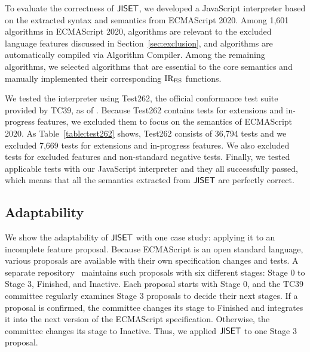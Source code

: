 To evaluate the correctness of \( \text{\sf JISET} \), we developed a JavaScript
interpreter based on the extracted syntax and semantics from
ECMAScript 2020.  Among 1,601 algorithms in ECMAScript 2020,
 algorithms are relevant to the excluded language features
discussed in Section~\ref{sec:exclusion}, and  algorithms
are automatically compiled via \textsf{Algorithm Compiler}.
Among the remaining  algorithms, we selected 
algorithms that are essential to the core semantics and manually
implemented their corresponding \( \text{IR}_\text{ES} \) functions.

We tested the interpreter using Test262, the official conformance test
suite provided by TC39, as of .  Because Test262
contains tests for extensions and in-progress features, we excluded
them to focus on the semantics of ECMAScript 2020.  As Table~\ref{table:test262} shows,
Test262 consists of 36,794 tests and we excluded 7,669 tests for
extensions and in-progress features.  We also excluded 
tests for excluded features and non-standard negative tests.
Finally, we tested  applicable tests with our JavaScript
interpreter and they all successfully passed, which means that all the
semantics extracted from \( \text{\sf JISET} \) are perfectly correct.


\subsection{Adaptability}
We show the adaptability of \( \text{\sf JISET} \) with one case study: applying
it to an incomplete feature proposal.  Because ECMAScript is an open
standard language, various proposals are available with their own
specification changes and tests.  A
separate repository~\cite{proposals} maintains such proposals with six
different stages: Stage 0 to Stage 3, Finished, and Inactive.  Each
proposal starts with Stage 0, and the TC39 committee regularly
examines Stage 3 proposals to decide their next stages.  If a proposal
is confirmed, the committee changes its stage to Finished and
integrates it into the next version of the ECMAScript specification.
Otherwise, the committee changes its stage to Inactive.  Thus, we
applied \( \text{\sf JISET} \) to one Stage 3 proposal.

